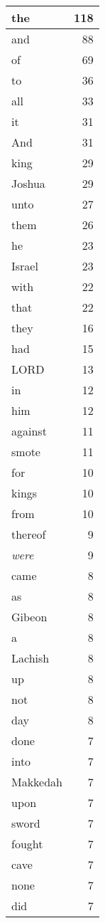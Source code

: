 \begin{center}
\begin{longtable}{l|r}
\hline \hline
\endlastfoot
the & 118 \\ \hline
and & 88 \\ \hline
of & 69 \\ \hline
to & 36 \\ \hline
all & 33 \\ \hline
it & 31 \\ \hline
And & 31 \\ \hline
king & 29 \\ \hline
Joshua & 29 \\ \hline
unto & 27 \\ \hline
them & 26 \\ \hline
he & 23 \\ \hline
Israel & 23 \\ \hline
with & 22 \\ \hline
that & 22 \\ \hline
they & 16 \\ \hline
had & 15 \\ \hline
LORD & 13 \\ \hline
in & 12 \\ \hline
him & 12 \\ \hline
against & 11 \\ \hline
smote & 11 \\ \hline
for & 10 \\ \hline
kings & 10 \\ \hline
from & 10 \\ \hline
thereof & 9 \\ \hline
\emph{were} & 9 \\ \hline
came & 8 \\ \hline
as & 8 \\ \hline
Gibeon & 8 \\ \hline
a & 8 \\ \hline
Lachish & 8 \\ \hline
up & 8 \\ \hline
not & 8 \\ \hline
day & 8 \\ \hline
done & 7 \\ \hline
into & 7 \\ \hline
Makkedah & 7 \\ \hline
upon & 7 \\ \hline
sword & 7 \\ \hline
fought & 7 \\ \hline
cave & 7 \\ \hline
none & 7 \\ \hline
did & 7 \\ \hline

\end{longtable}
\end{center}
